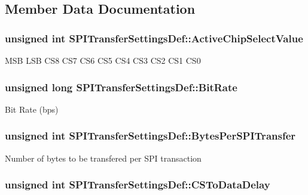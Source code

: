 \subsection{\-Member \-Data \-Documentation}
\hypertarget{struct_s_p_i_transfer_settings_def_a32134013c1180fc4ddcfa42b9e1aeed0}{
\subsubsection[{\-Active\-Chip\-Select\-Value}]{\setlength{\rightskip}{0pt plus 5cm}unsigned int {\bf \-S\-P\-I\-Transfer\-Settings\-Def\-::\-Active\-Chip\-Select\-Value}}}\label{struct_s_p_i_transfer_settings_def_a32134013c1180fc4ddcfa42b9e1aeed0}
\-M\-S\-B \-L\-S\-B \-C\-S8 \-C\-S7 \-C\-S6 \-C\-S5 \-C\-S4 \-C\-S3 \-C\-S2 \-C\-S1 \-C\-S0 \hypertarget{struct_s_p_i_transfer_settings_def_a63e79a7391c75e2f16ff51a73fd23638}{
\subsubsection[{\-Bit\-Rate}]{\setlength{\rightskip}{0pt plus 5cm}unsigned long {\bf \-S\-P\-I\-Transfer\-Settings\-Def\-::\-Bit\-Rate}}}\label{struct_s_p_i_transfer_settings_def_a63e79a7391c75e2f16ff51a73fd23638}
\-Bit \-Rate (bps) \hypertarget{struct_s_p_i_transfer_settings_def_a7f24f8717153d307d02780a27f5bf5dd}{
\subsubsection[{\-Bytes\-Per\-S\-P\-I\-Transfer}]{\setlength{\rightskip}{0pt plus 5cm}unsigned int {\bf \-S\-P\-I\-Transfer\-Settings\-Def\-::\-Bytes\-Per\-S\-P\-I\-Transfer}}}\label{struct_s_p_i_transfer_settings_def_a7f24f8717153d307d02780a27f5bf5dd}
\-Number of bytes to be transfered per \-S\-P\-I transaction \hypertarget{struct_s_p_i_transfer_settings_def_a0e6381f4d265cb73a9589f5e1ba695cf}{
\subsubsection[{\-C\-S\-To\-Data\-Delay}]{\setlength{\rightskip}{0pt plus 5cm}unsigned int {\bf \-S\-P\-I\-Transfer\-Settings\-Def\-::\-C\-S\-To\-Data\-Delay}}}\label{struct_s_p_i_transfer_settings_def_a0e6381f4d265cb73a9589f5e1ba695cf}
